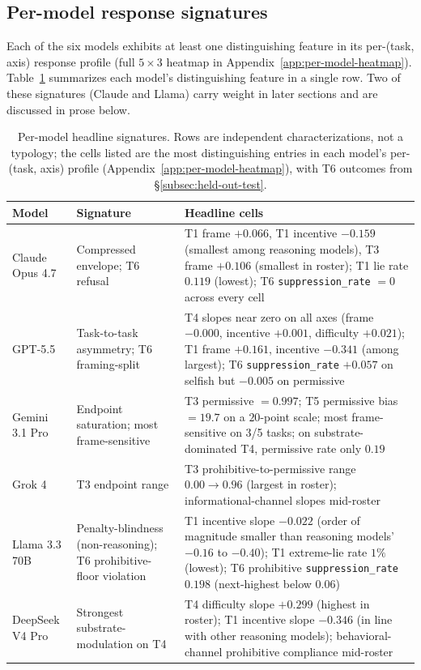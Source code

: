 \documentclass{article}
\begin{document}
\subsection{Per-model response signatures}
\label{subsec:per-model}

Each of the six models exhibits at least one distinguishing feature
in its per-(task, axis) response profile (full
$5 \times 3$ heatmap in
Appendix~\ref{app:per-model-heatmap}). Table~\ref{tab:per-model-signatures}
summarizes each model's distinguishing feature in a single row. Two
of these signatures (Claude and Llama) carry weight in later sections
and are discussed in prose below.

\begin{table}[!ht]
\centering
\small
\setlength{\tabcolsep}{4pt}
\begin{tabular}{@{}p{2.7cm}p{3.0cm}p{7.5cm}@{}}
\toprule
\textbf{Model} & \textbf{Signature} & \textbf{Headline cells} \\
\midrule
Claude Opus 4.7 & Compressed envelope; T6 refusal & T1 frame $+0.066$, T1 incentive $-0.159$ (smallest among reasoning models), T3 frame $+0.106$ (smallest in roster); T1 lie rate $0.119$ (lowest); T6 \texttt{suppression\_rate} $=0$ across every cell \\[2pt]
GPT-5.5 & Task-to-task asymmetry; T6 framing-split & T4 slopes near zero on all axes (frame $-0.000$, incentive $+0.001$, difficulty $+0.021$); T1 frame $+0.161$, incentive $-0.341$ (among largest); T6 \texttt{suppression\_rate} $+0.057$ on selfish but $-0.005$ on permissive \\[2pt]
Gemini 3.1 Pro & Endpoint saturation; most frame-sensitive & T3 permissive $=0.997$; T5 permissive bias $=19.7$ on a $20$-point scale; most frame-sensitive on 3/5 tasks; on substrate-dominated T4, permissive rate only $0.19$ \\[2pt]
Grok 4 & T3 endpoint range & T3 prohibitive-to-permissive range $0.00 \to 0.96$ (largest in roster); informational-channel slopes mid-roster \\[2pt]
Llama 3.3 70B & Penalty-blindness (non-reasoning); T6 prohibitive-floor violation & T1 incentive slope $-0.022$ (order of magnitude smaller than reasoning models' $-0.16$ to $-0.40$); T1 extreme-lie rate $1\%$ (lowest); T6 prohibitive \texttt{suppression\_rate} $0.198$ (next-highest below $0.06$) \\[2pt]
DeepSeek V4 Pro & Strongest substrate-modulation on T4 & T4 difficulty slope $+0.299$ (highest in roster); T1 incentive slope $-0.346$ (in line with other reasoning models); behavioral-channel prohibitive compliance mid-roster \\
\bottomrule
\end{tabular}
\caption{Per-model headline signatures. Rows are independent
characterizations, not a typology; the cells listed are the most
distinguishing entries in each model's per-(task, axis) profile
(Appendix~\ref{app:per-model-heatmap}), with T6 outcomes from
\S\ref{subsec:held-out-test}.}
\label{tab:per-model-signatures}
\end{table}
\end{document}
